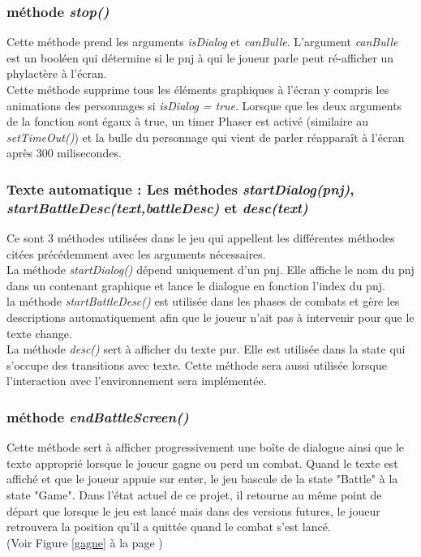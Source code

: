 \documentclass[11pt]{article}
\begin{document}
\begin{appendices}
\subsubsection{méthode \textit{stop()}}
Cette méthode prend les arguments \textit{isDialog} et \textit{canBulle}. L'argument \textit{canBulle} est un booléen qui détermine si le pnj à qui le joueur parle peut ré-afficher un phylactère à l'écran.\\

Cette méthode supprime tous les éléments graphiques à l'écran y compris les animations des personnages si \textit{isDialog = true}.  Lorsque que les deux arguments de la fonction sont égaux à true, un timer Phaser est activé (similaire au \textit{setTimeOut()}) et la bulle du personnage qui vient de parler réapparaît à l'écran après 300 milisecondes. 

\subsubsection{Texte automatique : Les méthodes \textit{startDialog(pnj)}, \textit{startBattleDesc(text,battleDesc)} et \textit{desc(text)}}
Ce sont 3 méthodes utilisées dans le jeu qui appellent les différentes méthodes citées précédemment avec les arguments nécessaires. \\

La méthode \textit{startDialog()} dépend uniquement d'un pnj. Elle affiche le nom du pnj dans un contenant graphique et lance le dialogue en fonction l'index du pnj. \\

la méthode \textit{startBattleDesc()} est utilisée dans les phases de combats et gère les descriptions automatiquement afin que le joueur n'ait pas à intervenir pour que le texte change. \\

La méthode \textit{desc()} sert à afficher du texte pur.  Elle est utilisée dans la state qui s'occupe des transitions avec texte. Cette méthode sera aussi utilisée lorsque l'interaction avec l'environnement sera implémentée.\\


\subsubsection{méthode \textit{endBattleScreen()}}
Cette méthode sert à afficher progressivement une boîte de dialogue ainsi que le texte approprié lorsque le joueur gagne ou perd un combat. Quand le texte est affiché et que le joueur appuie sur enter, le jeu bascule de la state "Battle" à la state "Game". Dans l'état actuel de ce projet, il retourne au même point de départ que lorsque le jeu est lancé mais dans des versions futures, le joueur retrouvera la position qu'il a quittée quand le combat s'est lancé.\\
(Voir Figure \ref{gagne} à la page \pageref{gagne})

\end{appendices}
\end{document}
